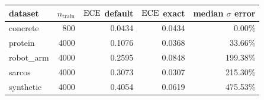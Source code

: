 \begin{tabular}{lrrrr}
\toprule
dataset & $n_{\text{train}}$ & $\mathrm{ECE}$ default & $\mathrm{ECE}$ exact & median $\sigma$ error \\
\midrule
concrete & 800 & 0.0434 & 0.0434 & 0.00\% \\
protein & 4000 & 0.1076 & 0.0368 & 33.66\% \\
robot\_arm & 4000 & 0.2595 & 0.0848 & 199.38\% \\
sarcos & 4000 & 0.3073 & 0.0307 & 215.30\% \\
synthetic & 4000 & 0.4054 & 0.0619 & 475.53\% \\
\bottomrule
\end{tabular}
